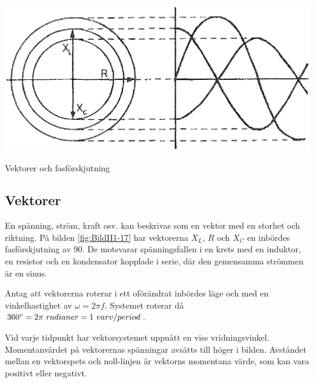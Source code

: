 \begin{marginfigure}%
  \includegraphics[]{images/cropped_pdfs/bild_2_1-17.pdf}
  \caption{Vektorer och fasförskjutning}
  \label{fig:BildII1-17}
\end{marginfigure}

\subsection{Vektorer}

En spänning, ström, kraft osv. kan beskrivas som en vektor med en storhet och
riktning.
På bilden \ref{fig:BildII1-17} har vektorerna \(X_L\), \(R\) och \(X_C\) en
inbördes fasförskjutning av 90\degree.
De motsvarar spänningsfallen i en krets med en induktor, en resistor och en
kondensator kopplade i serie, där den gemensamma strömmen är en sinus.

Antag att vektorerna roterar i ett oförändrat inbördes läge och med en
vinkelhastighet av \(\omega= 2\pi f\).
Systemet roterar då \(360\degree = 2\pi\ radianer = 1\ varv/period\).

Vid varje tidpunkt har vektorsystemet uppnått en viss vridningsvinkel.
Momentanvärdet på vektorernas spänningar avsätts till höger i bilden.
Avståndet mellan en vektorspets och noll-linjen är vektorns momentana värde,
som kan vara positivt eller negativt.
